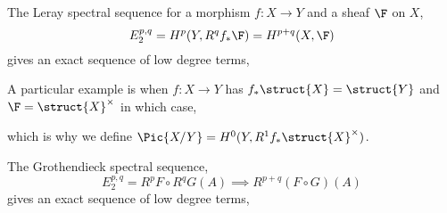 \documentclass[12pt]{article}
\begin{document}
\begin{example}
The Leray spectral sequence for a morphism $f : X \to Y$ and a sheaf $\F$ on $X$,
\[ E^{p,q}_2 = H^p(Y, R^q f_* \F) = H^{p+q}(X, \F) \]
gives an exact sequence of low degree terms,
\begin{center}
\end{center}
A particular example is when $f : X \to Y$ has $f_* \struct{X} = \struct{Y}$ and $\F = \struct{X}^\times$ in which case,
\begin{center}
\end{center}
which is why we define $\Pic{X/Y} = H^0(Y, R^1 f_* \struct{X}^\times)$.
\end{example}

\begin{example}
The Grothendieck spectral sequence,
\[ E^{p,q}_2 = R^p F \circ R^q G(A) \implies R^{p+q}(F \circ G)(A) \]
gives an exact sequence of low degree terms,
\begin{center}
\end{center}
\end{example}
\end{document}
